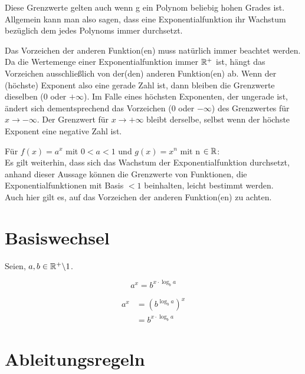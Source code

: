 \documentclass[main.tex]{subfiles}
\begin{document}
\begin{Bemerkung}
	Diese Grenzwerte gelten auch wenn g ein Polynom beliebig hohen Grades ist.\\
	Allgemein kann man also sagen, dass eine Exponentialfunktion ihr Wachstum bezüglich dem jedes Polynoms immer durchsetzt.
\end{Bemerkung}

\begin{Bemerkung}
	\danger Das Vorzeichen der anderen Funktion(en) muss natürlich immer beachtet werden.\\
	Da die Wertemenge einer Exponentialfunktion immer $\mathbb{R}^+$ ist, hängt das Vorzeichen ausschließlich von der(den) anderen Funktion(en) ab. Wenn der (höchste) Exponent also eine gerade Zahl ist, dann bleiben die Grenzwerte dieselben ($0$ oder $+\infty$). Im Falle eines höchsten Exponenten, der ungerade ist, ändert sich dementsprechend das Vorzeichen ($0$ oder $-\infty$) des Grenzwertes für $x\to -\infty$. Der Grenzwert für $x\to+\infty$ bleibt derselbe, selbst wenn der höchste Exponent eine negative Zahl ist.
\end{Bemerkung}

Für $f(x)= a^x$ mit $0<a<1$ und $g(x)=x^n$ mit n $\in \mathbb{R}$:\\
Es gilt weiterhin, dass sich das Wachstum der Exponentialfunktion durchsetzt, anhand dieser Aussage können die Grenzwerte von Funktionen, die Exponentialfunktionen mit Basis $<1$ beinhalten, leicht bestimmt werden.\\
\danger Auch hier gilt es, auf das Vorzeichen der anderen Funktion(en) zu achten.



\section{Basiswechsel}

Seien, $a,b\in\mathbb{R}^+\backslash1$.

\begin{Theorem}
	$$a^x=b^{ x\cdot\log_b a}$$
\end{Theorem}

\begin{Beweis}
	\begin{align*}
		a^x&=(b^{\log_b a})^x \\
		&=b^{x\cdot\log_b a }
	\end{align*}
\end{Beweis}



\section{Ableitungsregeln}
\end{document}
